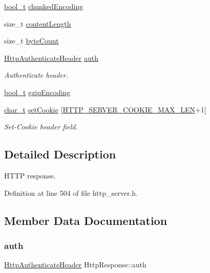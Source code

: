 \begin{DoxyCompactItemize}
\item 
\hyperlink{compiler__port_8h_a812d16e5494522586b3784e55d479912}{bool\+\_\+t} \hyperlink{structHttpResponse_ae06158a311c7c5cc0992a3bf6339428d}{chunked\+Encoding}
\item 
size\+\_\+t \hyperlink{structHttpResponse_a3d4a3be301195d777a3b0d8de35f975a}{content\+Length}
\item 
size\+\_\+t \hyperlink{structHttpResponse_a1d848b0a857f7a402285712ff02459ec}{byte\+Count}
\item 
\hyperlink{structHttpAuthenticateHeader}{Http\+Authenticate\+Header} \hyperlink{structHttpResponse_aa702a7cf4bb3c92f435f297ea5553194}{auth}
\begin{DoxyCompactList}\small\item\em Authenticate header. \end{DoxyCompactList}\item 
\hyperlink{compiler__port_8h_a812d16e5494522586b3784e55d479912}{bool\+\_\+t} \hyperlink{structHttpResponse_a20c4f097750e6246a191c16d135a183a}{gzip\+Encoding}
\item 
\hyperlink{compiler__port_8h_a40bb5262bf908c328fbcfbe5d29d0201}{char\+\_\+t} \hyperlink{structHttpResponse_a1df2ec2b99d15a5b061673a805da9342}{set\+Cookie} \mbox{[}\hyperlink{http__server_8h_ad5dfb8361753ec3dc34f805ed450fc4e}{H\+T\+T\+P\+\_\+\+S\+E\+R\+V\+E\+R\+\_\+\+C\+O\+O\+K\+I\+E\+\_\+\+M\+A\+X\+\_\+\+L\+EN}+1\mbox{]}
\begin{DoxyCompactList}\small\item\em Set-\/\+Cookie header field. \end{DoxyCompactList}\end{DoxyCompactItemize}


\subsection{Detailed Description}
H\+T\+TP response. 

Definition at line 504 of file http\+\_\+server.\+h.



\subsection{Member Data Documentation}
\mbox{\label{structHttpResponse_aa702a7cf4bb3c92f435f297ea5553194}} 
\subsubsection{\texorpdfstring{auth}{auth}}
{\footnotesize\ttfamily \hyperlink{structHttpAuthenticateHeader}{Http\+Authenticate\+Header} Http\+Response\+::auth}



